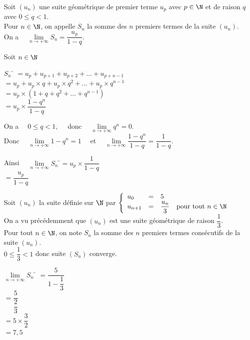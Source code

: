 \documentclass[a4paper,11pt,cours]{nsi} %
\begin{document}
\begin{propriete}
    Soit $(u_n)$ une suite géométrique de premier terme $u_p$ avec $p\in\N$ et de raison $q$ avec $0\leqslant q < 1$.\\
    Pour $n\in\N$, on appelle $S_n$ la somme des $n$ premiers termes de la suite $(u_n)$.\\[.5em]
    On a $\quad \lim\limits_{n\to+\infty} S_n=\dfrac{u_p}{1-q}$.
\end{propriete}

\begin{demonstration}
    Soit $n\in\N$
    \begin{tabbing}
        $S_n$   \= $=u_p+u_{p+1}+u_{p+2}+...+u_{p+n-1}$\\[.5em]
            \> $=u_p + u_p\times q + u_p\times q^2 +... + u_p\times q^{n-1}$\\[.5em]
            \> $=u_p\times \left(1+q+q^2+...+q^{n-1}\right)$\\[.5em]
            \> $=u_p\times \dfrac{1-q^n}{1-q}$
    \end{tabbing}
    On a $\quad 0\leqslant q <1, \quad$ donc $\quad \lim\limits_{n\to+\infty} q^n=0$.\\[.5em]
    Donc $\quad \lim\limits_{n\to+\infty} 1-q^n=1 \quad$ et $\quad \lim\limits_{n\to+\infty} \dfrac{1-q^n}{1-q}=\dfrac{1}{1-q}$.
    \begin{tabbing}
        Ainsi $\quad \lim\limits_{n\to+\infty} S_n$ \=$=u_p\times \dfrac{1}{1-q}$\\[.5em]
        \>$=\dfrac{u_p}{1-q}$
    \end{tabbing}
\end{demonstration}

\begin{exemple}[]
    Soit $(u_n)$ la suite définie sur $\N$ par $\left\{
		\begin{array}{llll}
			u_0 & = & 5 & \\
			u_{n+1} & = & \dfrac{u_n}{3} & \text{pour tout } n\in\N\\
		\end{array}
    \right. $\\
    On a vu précédemment que $(u_n)$ est une suite géométrique de raison $\dfrac{1}{3}$.\\[.5em]
    Pour tout $n\in\N$, on note $S_n$ la somme des $n$ premiers termes consécutifs de la suite $(u_n)$.\\
    $0\leqslant \dfrac{1}{3}<1$ donc suite $(S_n)$ converge.
    \begin{tabbing}
        $\lim\limits_{n\to+\infty}S_n$  \= $=\dfrac{5}{1-\dfrac{1}{3}}$\\[.5em]
            \>  $=\dfrac{5}{\dfrac{2}{3}}$\\[.5em]
            \>  $=5\times \dfrac{3}{2}$\\[.5em]
            \>  $=7,5$
    \end{tabbing}
    
\end{exemple}
\end{document}
